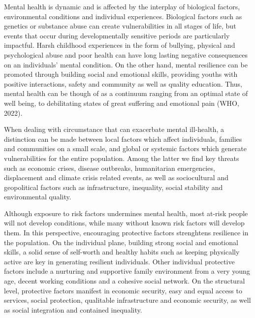     Mental health is dynamic and is affected by the interplay of biological factors, environmental conditions and individual experiences. Biological factors such as genetics or substance abuse can create vulnerabilities in all stages of life, but events that occur during developmentally sensitive periods are particularly impactful. Harsh childhood experiences in the form of bullying, physical and psychological abuse and poor health can have long lasting negative consequences on an individuals' mental condition. On the other hand, mental resilience can be promoted through building social and emotional skills, providing youths with positive interactions, safety and community as well as quality education. 
    Thus, mental health can be though of as a continuum ranging from an optimal state of well being, to debilitating states of great suffering and emotional pain (WHO, 2022).

    When dealing with circumstance that can exacerbate mental ill-health, a distinction can be made between local factors which affect individuals, families and communities on a small scale, and global or systemic factors which generate vulnerabilities for the entire population. Among the latter we find key threats such as economic crises, disease outbreaks, humanitarian emergencies, displacement and climate crisis related events, as well as sociocultural and geopolitical factors such as infrastructure, inequality, social stability and environmental quality. 
    
    Although exposure to risk factors undermines mental health, most at-risk people will not develop conditions, while many without known risk factors will develop them. In this perspective, encouraging protective factors strenghtens resilience in the population. On the individual plane, building strong social and emotional skills, a solid sense of self-worth and healthy habits such as keeping physically active are key in generating resilient individuals. Other individual protective factors include a nurturing and supportive family environment from a very young age, decent working conditions and a cohesive social network. On the structural level, protective factors manifest in economic security, easy and equal access to services, social protection, qualitable infrastructure and economic security, as well as social integration and contained inequality.  


        



